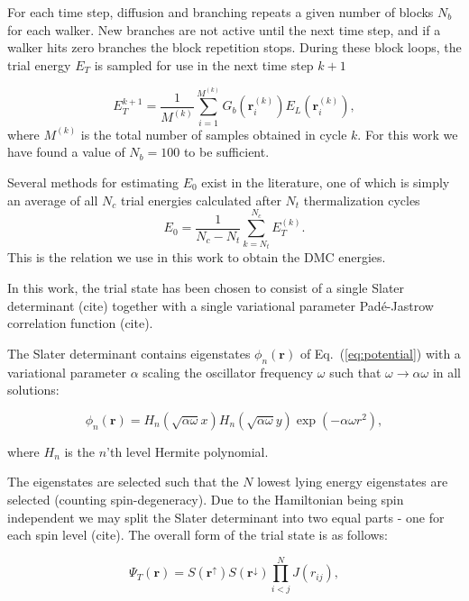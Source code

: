 \documentclass[amsmath, amssymb, aps, floatfix, nofootinbib, preprintnumbers,showpacs, superscriptaddress, twocolumn]{revtex4-1}
\begin{document}
For each time step, diffusion and branching repeats a given number of blocks $N_b$ for each walker. New branches are not active until the next time step, and if a walker hits zero branches the block repetition stops. During these block loops, the trial energy $E_T$ is sampled for use in the next time step $k+1$

\begin{equation}
 E_T^{k+1} = \frac{1}{M^{(k)}}\sum_{i=1}^{M^{(k)}} G_b(\mathbf{r}^{(k)}_i)E_L(\mathbf{r}^{(k)}_i),
\end{equation}
\noindent
where $M^{(k)}$ is the total number of samples obtained in cycle $k$. For this work we have found a value of $N_b = 100$ to be sufficient.

Several methods for estimating $E_0$ exist in the literature, one of which is simply an average of all $N_c$ trial energies calculated after $N_t$ thermalization cycles
\begin{equation}
 E_0 = \frac{1}{N_c-N_t}\sum\limits_{k=N_t}^{N_c} E_T^{(k)}.
\end{equation}
This is the relation we use in this work to obtain the DMC energies.

In this work, the trial state has been chosen to consist of a single Slater determinant (cite)
together with a single variational parameter Padé-Jastrow correlation function (cite).

The Slater determinant contains eigenstates $\phi_n(\mathbf{r})$ of Eq.~(\ref{eq:potential})
with a variational parameter $\alpha$ scaling the oscillator frequency $\omega$
such that $\omega\to\alpha\omega$ in all solutions:

\begin{equation}
 \phi_n(\mathbf{r}) = H_n(\sqrt{\alpha\omega}x)H_n(\sqrt{\alpha\omega}y)\exp(-\alpha\omega r^2),
\end{equation}

\noindent
where $H_n$ is the $n$'th level Hermite polynomial.


The eigenstates are selected such that the $N$ lowest lying energy eigenstates are selected (counting spin-degeneracy). Due to the Hamiltonian being spin independent we may split the Slater determinant into two equal parts -
one for each spin level (cite). The overall form of the trial state is as follows:

\begin{equation}
 \Psi_T(\mathbf{r}) = S(\mathbf{r}^\uparrow) S(\mathbf{r}^\downarrow) \prod_{i<j}^{N} J(r_{ij}),
\end{equation}
\end{document}

